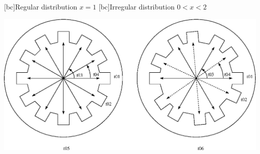 \begin{psfrags}%
\psfragscanon

[bc]{Regular distribution $x=1$}
[bc]{Irregular distribution $0<x<2$}

\includegraphics[width=1.00\textwidth]{figs/f_slotstar.eps}
\end{psfrags}%
